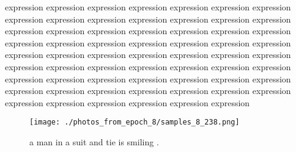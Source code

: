\documentclass{article}%
\begin{document}
expression expression expression expression expression expression expression expression expression expression expression expression expression expression expression expression expression expression expression expression expression expression expression expression expression expression expression expression expression expression expression expression expression expression expression expression expression expression expression expression expression expression expression expression expression expression expression expression expression expression expression expression expression expression expression expression expression expression expression expression expression expression

%


\begin{figure}[h!]%
\centering%
\texttt{[image: ./photos\_from\_epoch\_8/samples\_8\_238.png]}%
\caption{a man in a suit and tie is smiling .}%
\end{figure}

%
\end{document}
